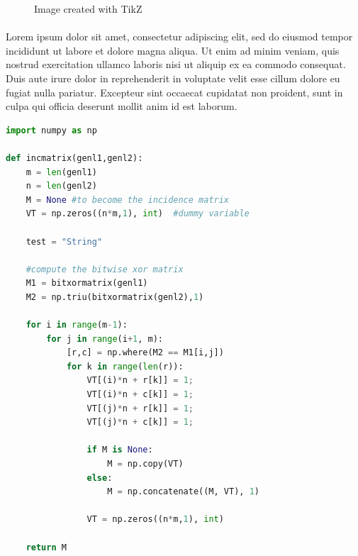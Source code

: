 

\begin{figure}[ht]
    \centering
    
    \caption{Image created with TikZ} \label{fig:T1}
\end{figure}




\paragraph{}
Lorem ipsum dolor sit amet, consectetur adipiscing elit, sed do eiusmod tempor incididunt ut labore et dolore magna aliqua. Ut enim ad minim veniam, quis nostrud exercitation ullamco laboris nisi ut aliquip ex ea commodo consequat. Duis aute irure dolor in reprehenderit in voluptate velit esse cillum dolore eu fugiat nulla pariatur. Excepteur sint occaecat cupidatat non proident, sunt in culpa qui officia deserunt mollit anim id est laborum.




\begin{lstlisting}[language=Python, caption=Code snippet example]
import numpy as np
    
def incmatrix(genl1,genl2):
    m = len(genl1)
    n = len(genl2)
    M = None #to become the incidence matrix
    VT = np.zeros((n*m,1), int)  #dummy variable

    test = "String"
    
    #compute the bitwise xor matrix
    M1 = bitxormatrix(genl1)
    M2 = np.triu(bitxormatrix(genl2),1) 

    for i in range(m-1):
        for j in range(i+1, m):
            [r,c] = np.where(M2 == M1[i,j])
            for k in range(len(r)):
                VT[(i)*n + r[k]] = 1;
                VT[(i)*n + c[k]] = 1;
                VT[(j)*n + r[k]] = 1;
                VT[(j)*n + c[k]] = 1;
                
                if M is None:
                    M = np.copy(VT)
                else:
                    M = np.concatenate((M, VT), 1)
                
                VT = np.zeros((n*m,1), int)
    
    return M
\end{lstlisting}


